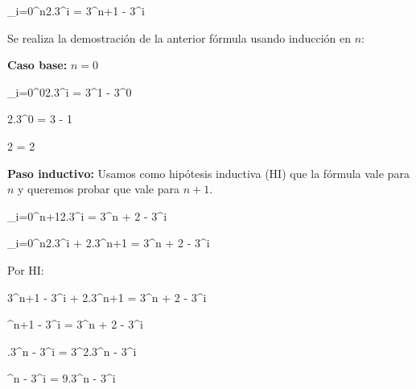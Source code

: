     \newline
    \begin{center}

    \sum_{i=0}^{n}2.3^i = 3^{n+1} - 3^i

    \end{center}

    Se realiza la demostración de la anterior fórmula usando inducción en $n$: 

   \newline
    \textbf{Caso base:} $n = 0$

    \newline
    \begin{center}
    
    \sum_{i=0}^{0}2.3^i = 3^{1} - 3^0

    \newline

    2.3^0 = 3 - 1

	\newline

    2 = 2
    \end{center} 

    \newline
    \textbf{Paso inductivo:} Usamos como hipótesis inductiva (HI) que la fórmula vale para $n$ y queremos probar que vale para $n + 1$.

    \newline
    \begin{center}

    \sum_{i=0}^{n+1}2.3^i = 3^{n + 2} - 3^i

    \newline
    \sum_{i=0}^{n}2.3^i + 2.3^{n+1} = 3^{n + 2} - 3^i

    \newline
    Por HI:

    3^{n+1} - 3^i + 2.3^{n+1} = 3^{n + 2} - 3^i

   	^{n+1} - 3^i = 3^{n + 2} - 3^i

   	.3^{n} - 3^i = 3^{2}.3^{n} - 3^i

   	^{n} - 3^i = 9.3^{n} - 3^i

    \end{center} 

	\begin{flushright}

	\Box
	\end{flushright}

